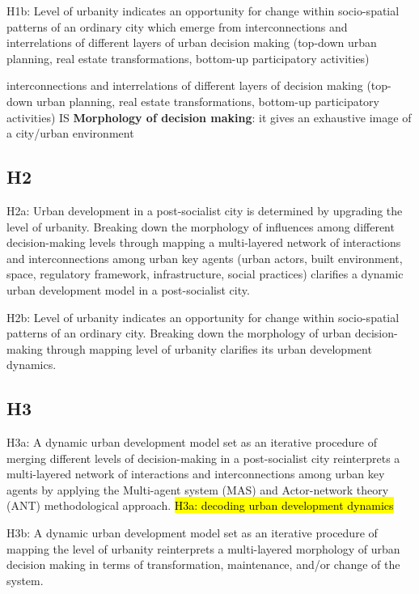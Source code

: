 \documentclass[11pt]{report}
\begin{document}
H1b: Level of urbanity indicates an opportunity for change within socio-spatial patterns of an ordinary city which emerge from interconnections and interrelations  of  different  layers  of urban decision  making (top-down urban planning, real estate transformations, bottom-up participatory activities)

interconnections and interrelations  of  different  layers  of  decision  making (top-down urban planning, real estate transformations, bottom-up participatory activities) IS \textbf{Morphology of decision making}: it gives an exhaustive image of a city/urban environment 

\subsection{H2}

H2a:  Urban  development  in  a  post-socialist  city  is  determined  by  upgrading  the  level  of  urbanity.  Breaking  down  the 
morphology of influences among different decision-making levels through mapping a multi-layered network of interactions 
and interconnections among urban key agents (urban actors, built environment, space, regulatory framework, infrastructure, 
social practices) clarifies a dynamic urban development model in a post-socialist city.

H2b: Level of urbanity indicates an opportunity for change within socio-spatial patterns of an ordinary city.
Breaking  down  the morphology of urban
decision-making through mapping level of urbanity clarifies its urban development dynamics.

\subsection{H3}

H3a: A dynamic urban development model set as an iterative procedure of merging different levels of decision-making in a post-socialist  city  reinterprets  a  multi-layered  network  of  interactions  and  interconnections  among  urban  key  agents  by applying the Multi-agent system (MAS) and Actor-network theory (ANT) methodological approach.
\hl{H3a: decoding urban development dynamics}

H3b: A dynamic urban development model set as an iterative procedure of mapping the level of urbanity reinterprets a  multi-layered  morphology  of urban decision making
in terms of transformation, maintenance, and/or change of the system.
\end{document}
